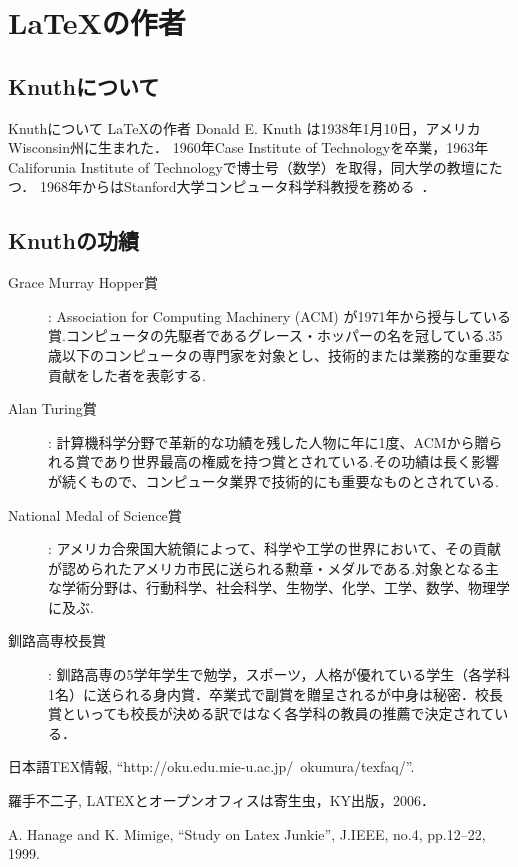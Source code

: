 \documentclass[a4j]{jarticle}
\begin{document}
\section{\LaTeX の作者}

\subsection{Knuthについて}
\begin{itembox}[l]{Knuthについて}
\LaTeX の作者 Donald E. Knuth は1938年1月10日，アメリカWisconsin州に生まれた．
1960年Case Institute of Technologyを卒業，1963年Califorunia Institute of Technologyで博士号（数学）を取得，同大学の教壇にたつ．
1968年からはStanford大学コンピュータ科学科教授を務める~\cite{W3TEX}．
\end{itembox}

\subsection{Knuthの功績}

\begin{description}

\item[Grace Murray Hopper賞]:
Association for Computing Machinery (ACM) が1971年から授与している賞.コンピュータの先駆者であるグレース・ホッパーの名を冠している.35歳以下のコンピュータの専門家を対象とし、技術的または業務的な重要な貢献をした者を表彰する.

\item[Alan Turing賞]:
計算機科学分野で革新的な功績を残した人物に年に1度、ACMから贈られる賞であり世界最高の権威を持つ賞とされている.その功績は長く影響が続くもので、コンピュータ業界で技術的にも重要なものとされている.

\item[National Medal of Science賞]:
アメリカ合衆国大統領によって、科学や工学の世界において、その貢献が認められたアメリカ市民に送られる勲章・メダルである.対象となる主な学術分野は、行動科学、社会科学、生物学、化学、工学、数学、物理学に及ぶ.

\item[釧路高専校長賞]:
釧路高専の5学年学生で勉学，スポーツ，人格が優れている学生（各学科1名）に送られる身内賞．卒業式で副賞を贈呈されるが中身は秘密．校長賞といっても校長が決める訳ではなく各学科の教員の推薦で決定されている．

\end{description}


\begin{thebibliography}{99}

日本語TEX情報, ``http://oku.edu.mie-u.ac.jp/~okumura/texfaq/''.
  
羅手不二子, LATEXとオープンオフィスは寄生虫，KY出版，2006．

A. Hanage and K. Mimige, ``Study on Latex Junkie'', J.IEEE, no.4, pp.12--22, 1999.


\end{thebibliography}
\end{document}
